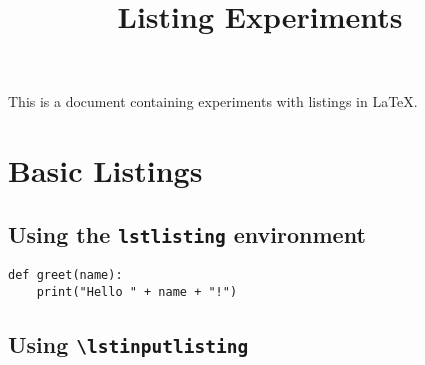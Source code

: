 \documentclass{scrartcl}
\begin{document}
  \title{Listing Experiments}

  \maketitle
  
  This is a document containing experiments with listings in \LaTeX.

  \section{Basic Listings}

  \subsection{Using the \texttt{lstlisting} environment}

    \begin{lstlisting}[style=numbers]
def greet(name):
    print("Hello " + name + "!")
    \end{lstlisting}

  \subsection{Using \texttt{\textbackslash lstinputlisting}}
    \lstset{inputpath=code}
    
    
\end{document}
